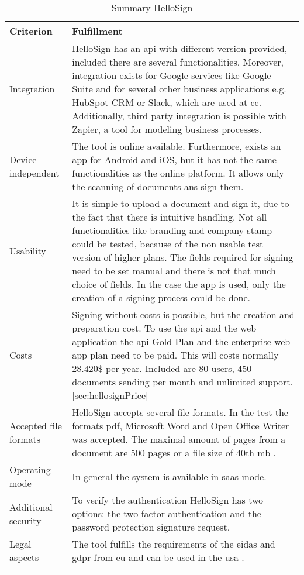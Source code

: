 	\begin{longtable}{|p{4cm}|p{10cm}|} \hline
		Criterion & Fulfillment \\ \hline
		Integration & HelloSign has an \gls{api} with different version provided, included there are several functionalities. Moreover, integration exists for Google services like Google Suite and for several other business applications e.g. HubSpot CRM or Slack, which are used at \gls{cc}. Additionally, third party integration is possible with Zapier, a tool for modeling business processes. \parencite{hellosign2018integration,hellosign2018api}\\ \hline
		Device independent & The tool is online available. Furthermore, exists an \gls{app} for Android and iOS, but it has not the same functionalities as the online platform. It allows only the scanning of documents ans sign them. \parencite{hellosign2018legal}\\ \hline
		Usability & It is simple to upload a document and sign it, due to the fact that there is intuitive handling. Not all functionalities like branding and company stamp could be tested, because of the non usable test version of higher plans. The fields required for signing need to be set manual and there is not that much choice of fields. In the case the \gls{app} is used, only the creation of a signing process could be done.\\ \hline
		Costs &  Signing without costs is possible, but the creation and preparation cost. To use the \gls{api} and the web application the \gls{api} Gold Plan and the enterprise web app plan need to be paid. This will costs normally 28.420\$ per year. Included are 80 users, 450 documents sending per month and unlimited support. \ref{sec:hellosignPrice} \\ \hline
		Accepted file formats & HelloSign accepts several file formats. In the test the formats \gls{pdf}, Microsoft Word and Open Office Writer was accepted. The maximal amount of pages from a document are 500 pages or a file size of 40th \gls{mb} \parencite{hellosign2018documents}.\\ \hline
		Operating mode & In general the system is available in \gls{saas} mode. \parencite{hellosign2018features} \\ \hline
		Additional security & To verify the authentication HelloSign has two options: the two-factor authentication and the password protection signature request.\parencite{hellosign2018security} \\ \hline
		Legal aspects & The tool fulfills the requirements of the \gls{eidas} and \gls{gdpr} from \gls{eu} and can be used in the \gls{usa} \parencite{hellosign2018legal,hellosign2018compliance}. \\ \hline
	\caption{Summary HelloSign}
	\label{tab:hellosign}
	\end{longtable}

